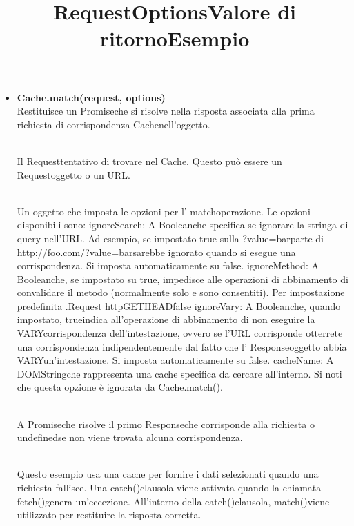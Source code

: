 \documentclass[italian]{article}
\begin{document}
\begin{itemize}
	\item \textbf{Cache.match(request, options)}\\
	Restituisce un Promiseche si risolve nella risposta associata alla prima richiesta di corrispondenza Cachenell'oggetto.\\
	\title{\textbf{Request}}\\
	Il Requesttentativo di trovare nel Cache. Questo può essere un   Requestoggetto o un URL.\\
	\title{\textbf{Options}}\\
	Un oggetto che imposta le opzioni per l' matchoperazione. Le opzioni disponibili sono:
	ignoreSearch: A Booleanche specifica se ignorare la stringa di query nell'URL. Ad esempio, se impostato true sulla  ?value=barparte di http://foo.com/?value=barsarebbe ignorato quando si esegue una corrispondenza. Si imposta automaticamente su false.
	ignoreMethod: A Booleanche, se impostato su true, impedisce alle operazioni di abbinamento di convalidare il metodo (normalmente solo e sono consentiti). Per impostazione predefinita .Request httpGETHEADfalse
	ignoreVary: A Booleanche, quando impostato, trueindica all'operazione di abbinamento di non eseguire la VARYcorrispondenza dell'intestazione, ovvero se l'URL corrisponde otterrete una corrispondenza indipendentemente dal fatto che l' Responseoggetto abbia VARYun'intestazione. Si imposta automaticamente su false.
	cacheName: A DOMStringche rappresenta una cache specifica da cercare all'interno. Si noti che questa opzione è ignorata da Cache.match().\\
	\title{\textbf{Valore di ritorno}}\\
	A Promiseche risolve il primo Responseche corrisponde alla richiesta o undefinedse non viene trovata alcuna corrispondenza.\\
	\title{\textbf{Esempio}}\\
	Questo esempio usa una cache per fornire i dati selezionati quando una richiesta fallisce. Una catch()clausola viene attivata quando la chiamata fetch()genera un'eccezione. All'interno della catch()clausola,  match()viene utilizzato per restituire la risposta corretta.
	

\end{itemize}
\end{document}
